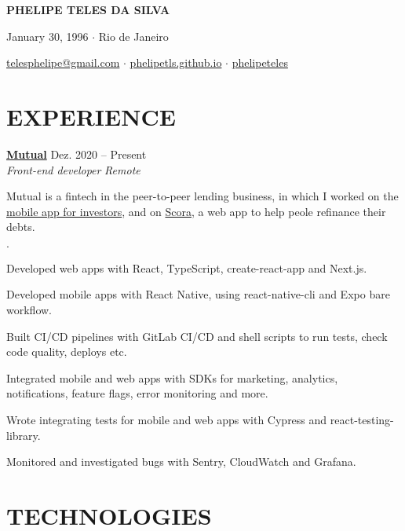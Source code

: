 \documentclass[12pt]{article}
\newenvironment{tightlist}
  {\begin{list}
    {$\cdot$}
    {
      \setlength{\leftmargin}{0em}
      \setlength{\itemsep}{\smallskipamount}
    }
  }
{\end{list}}
\begin{document}
\pagestyle{empty}

\centerline{\huge\bf PHELIPE TELES DA SILVA}
\medskip

\centerline{January 30, 1996 $\cdot$ Rio de Janeiro}
\smallskip

\centerline{
  \href{mailto:telesphelipe@gmail.com}{ telesphelipe@gmail.com}
  $\cdot$
  \href{https://phelipetls.github.io}{ phelipetls.github.io}
  $\cdot$
  \href{https://linkedin.com/in/phelipeteles}{ phelipeteles}
}
\smallskip

\section*{EXPERIENCE}

\textbf{\href{https://mutual.club}{Mutual}} \hfill Dez. 2020 -- Present \\
\textit{Front-end developer} \hfill \textit{Remote} {\parfillskip=0pt\par}

Mutual is a fintech in the peer-to-peer lending business, in which I worked on
the \href{https://mutual.club/en/invest.html}{mobile app for investors}, and on
\href{https://scora.com.br/}{Scora}, a web app to help peole refinance their
debts.

\begin{tightlist}
  \item Developed web apps with React, TypeScript, create-react-app and Next.js.
  \item Developed mobile apps with React Native, using react-native-cli and Expo
    bare workflow.
  \item Built CI/CD pipelines with GitLab CI/CD and shell scripts to run tests,
    check code quality, deploys etc.
  \item Integrated mobile and web apps with SDKs for marketing, analytics,
    notifications, feature flags, error monitoring and more.
  \item Wrote integrating tests for mobile and web apps with Cypress and
    react-testing-library.
  \item Monitored and investigated bugs with Sentry, CloudWatch and Grafana.
\end{tightlist}

\section*{TECHNOLOGIES}
\end{document}
